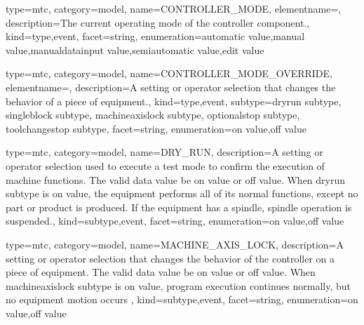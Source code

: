 {
  type=mtc,
  category=model,
  name={CONTROLLER\_MODE},
  elementname=,
  description={The current operating mode of the \gls{controller} component.},
  kind={type,event},
  facet={\gls{string}},
  enumeration={\gls{automatic value},\gls{manual value},\gls{manualdatainput value},\gls{semiautomatic value},\gls{edit value}}
}


{
  type=mtc,
  category=model,
  name={CONTROLLER\_MODE\_OVERRIDE},
  elementname=,
  description={A setting or operator selection that changes the behavior of a piece of equipment.},
  kind={type,event},
  subtype={\gls{dryrun subtype}, \gls{singleblock subtype}, \gls{machineaxislock subtype}, \gls{optionalstop subtype}, \gls{toolchangestop subtype}},
  facet={\gls{string}},
  enumeration={\gls{on value},\gls{off value}}
}


{
  type=mtc,
  category=model,
  name={DRY\_RUN},
  description={A setting or operator selection used to execute a test mode to confirm the execution of machine functions. \newline The \gls{valid data value} \must be \gls{on value} or \gls{off value}. \newline When \gls{dryrun subtype} is \gls{on value}, the equipment performs all of its normal functions, except no part or product is produced.  If the equipment has a spindle, spindle operation is suspended.},
  kind={subtype,event},
  facet={\gls{string}},
  enumeration={\gls{on value},\gls{off value}}
}


{
  type=mtc,
  category=model,
  name={MACHINE\_AXIS\_LOCK},
  description={A setting or operator selection that changes the behavior of the controller on a piece of equipment. \newline The \gls{valid data value} \must be \gls{on value} or \gls{off value}. \newline When \gls{machineaxislock subtype} is \gls{on value}, program execution continues normally, but no equipment motion occurs },
  kind={subtype,event},
  facet={\gls{string}},
  enumeration={\gls{on value},\gls{off value}}
}


